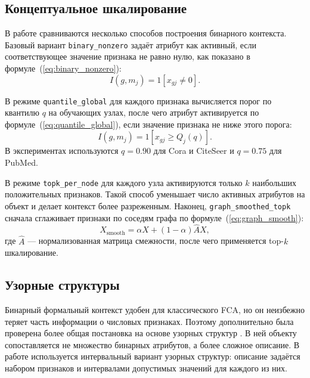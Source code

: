 \documentclass[14pt,a4paper]{extarticle}
\begin{document}
\subsection{Концептуальное шкалирование}

В работе сравниваются несколько способов построения бинарного контекста. Базовый
вариант \texttt{binary\_nonzero} задаёт атрибут как активный, если
соответствующее значение признака не равно нулю, как показано в
формуле~(\ref{eq:binary_nonzero}):
\begin{equation}
    I(g,m_j) = 1[x_{gj} \neq 0].
    \label{eq:binary_nonzero}
\end{equation}

В режиме \texttt{quantile\_global} для каждого признака вычисляется порог по
квантилю $q$ на обучающих узлах, после чего атрибут активируется по
формуле~(\ref{eq:quantile_global}), если значение признака не ниже этого порога:
\begin{equation}
    I(g,m_j) = 1[x_{gj} \geq Q_j(q)].
    \label{eq:quantile_global}
\end{equation}
В экспериментах используются $q=0.90$ для Cora и CiteSeer и $q=0.75$ для PubMed.

В режиме \texttt{topk\_per\_node} для каждого узла активируются только $k$
наибольших положительных признаков. Такой способ уменьшает число активных
атрибутов на объект и делает контекст более разреженным. Наконец,
\texttt{graph\_smoothed\_topk} сначала сглаживает признаки по соседям графа по
формуле~(\ref{eq:graph_smooth}):
\begin{equation}
    X_{\text{smooth}} = \alpha X + (1-\alpha)\hat{A}X,
    \label{eq:graph_smooth}
\end{equation}
где $\hat{A}$ --- нормализованная матрица смежности, после чего применяется
top-$k$ шкалирование.

\subsection{Узорные структуры}

Бинарный формальный контекст удобен для классического FCA, но он неизбежно
теряет часть информации о числовых признаках. Поэтому дополнительно была
проверена более общая постановка на основе узорных структур
\cite{gnedo1991patternstructures}. В ней объекту сопоставляется не множество
бинарных атрибутов, а более сложное описание. В работе используется интервальный
вариант узорных структур: описание задаётся набором признаков и интервалами
допустимых значений для каждого из них.
\end{document}
